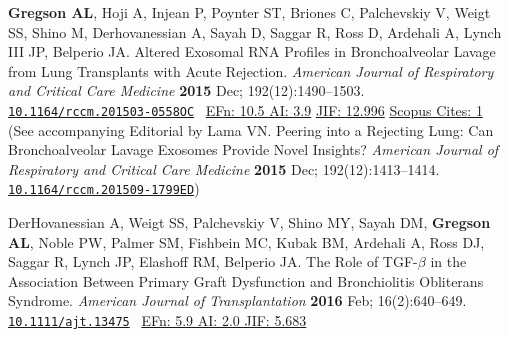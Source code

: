 \documentclass[letterpaper,11pt,sans,final]{/usr/local/share/texmf-dist/tex/latex/moderncv/moderncv}%
\begin{document}
\begin{thebibliography}{1}
  \bibitem[28]{} \textbf{Gregson AL}, Hoji A, Injean P, Poynter ST, Briones C, Palchevskiy V, Weigt SS, Shino M, Derhovanessian A, Sayah D, Saggar R, Ross D, Ardehali A, Lynch III JP, Belperio JA. Altered Exosomal RNA Profiles in Bronchoalveolar Lavage from Lung Transplants with Acute Rejection. {\color{BrickRed}\textit{American Journal of Respiratory and Critical Care Medicine}} \textbf{2015} Dec; 192(12):1490--1503. \href{http://www.atsjournals.org/doi/abs/10.1164/rccm.201503-0558OC#.VeDm8JWW25M}{\nolinkurl{10.1164/rccm.201503-0558OC}}~ 
    {\color{NavyBlue}\href{http://www.eigenfactor.org/rankings.php?bsearch=AMERICAN+JOURNAL+OF+RESPIRATORY+AND+CRITICAL+CARE+MEDICINE&searchby=journal&orderby=eigenfactor}{{\smaller EFn: 10.5 AI: 3.9}}
      \href{http://admin-apps.webofknowledge.com/JCR/JCR?RQ=RECORD&rank=1&journal=AM+J+RESP+CRIT+CARE}{{\smaller JIF: 12.996}}
      \href{http://www.scopus.com/record/display.uri?eid=2-s2.0-84951933250&origin=resultslist&sort=plf-f&src=s&st1=gregson+&st2=&sid=A253098209782A207E8DEF555629A3D6.iqs8TDG0Wy6BURhzD3nFA%3a90&sot=b&sdt=b&sl=19&s=FIRSTAUTH%28gregson+%29&relpos=0&citeCnt=1&searchTerm=FIRSTAUTH%28gregson+%29}{{\smaller Scopus Cites: 1}}
    }~ 
    \\(See accompanying Editorial by Lama VN. Peering into a Rejecting Lung: Can Bronchoalveolar Lavage Exosomes Provide Novel Insights? {\color{BrickRed}\textit{American Journal of Respiratory and Critical Care Medicine}} \textbf{2015} Dec; 192(12):1413--1414. \href{http://www.atsjournals.org/doi/abs/10.1164/rccm.201509-1799ED}{\nolinkurl{10.1164/rccm.201509-1799ED}})

  \bibitem[29]{} DerHovanessian A, Weigt SS, Palchevskiy V, Shino MY, Sayah DM, \textbf{Gregson AL}, Noble PW, Palmer SM, Fishbein MC, Kubak BM, Ardehali A, Ross DJ, Saggar R, Lynch JP, Elashoff RM, Belperio JA. The Role of {\smaller TGF}-$\beta$ in the Association Between Primary Graft Dysfunction and Bronchiolitis Obliterans Syndrome. {\color{BrickRed}\textit{American Journal of Transplantation}} \textbf{2016} Feb; 16(2):640--649. \href{http://onlinelibrary.wiley.com/doi/10.1111/ajt.13475/abstract}{\nolinkurl{10.1111/ajt.13475}}~
       {\color{NavyBlue}\href{http://52.6.43.8/projects/journalRank/rankings.php?bsearch=AMERICAN+JOURNAL+OF+TRANSPLANTATION&searchby=journal&orderby=eigenfactor}{{\smaller EFn: 5.9 AI: 2.0 JIF: 5.683}} 
       }


\end{thebibliography}
\end{document}
